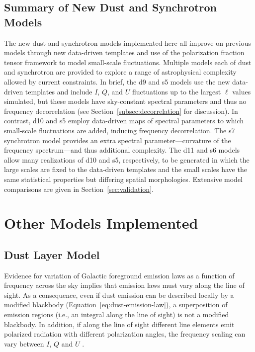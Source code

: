 \documentclass[twocolumn]{aastex631}
\begin{document}
\subsection{Summary of New Dust and Synchrotron Models}
The new dust and synchrotron models implemented here all improve on previous models through new data-driven templates and use of the polarization fraction tensor framework to model small-scale fluctuations. Multiple models each of dust and synchrotron are provided to explore a range of astrophysical complexity allowed by current constraints. In brief, the d9 and s5 models use the new data-driven templates and include $I$, $Q$, and $U$ fluctuations up to the largest $\ell$ values simulated, but these models have sky-constant spectral parameters and thus no frequency decorrelation (see Section~\ref{subsec:decorrelation} for discussion). In contrast, d10 and s5 employ data-driven maps of spectral parameters to which small-scale fluctuations are added, inducing frequency decorrelation. The s7 synchrotron model provides an extra spectral parameter---curvature of the frequency spectrum---and thus additional complexity. The d11 and s6 models allow many realizations of d10 and s5, respectively, to be generated in which the large scales are fixed to the data-driven templates and the small scales have the same statistical properties but differing spatial morphologies. Extensive model comparisons are given in Section~\ref{sec:validation}.

\section{Other Models Implemented} \label{sec:other_models}

\subsection{Dust Layer Model} \label{sec:layers}
Evidence for variation of Galactic foreground emission laws as a function of frequency across the sky implies that emission laws must vary along the line of sight. As a consequence, even if dust emission can be described locally by a modified blackbody (Equation~\ref{eq:dust-emission-law}), a superposition of emission regions (i.e., an integral along the line of sight) is not a modified blackbody. In addition, if along the line of sight different line elements emit polarized radiation with different polarization angles, the frequency scaling can vary between $I$, $Q$ and $U$ \citep{Tassis:2015}.
\end{document}
